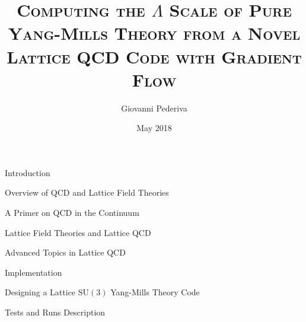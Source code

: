 \documentclass[twoside,english, a4paper, 11pt]{shared/uiofysmaster}
\author{Giovanni Pederiva}
\title{{\scshape Computing the $\Lambda$ Scale of Pure Yang-Mills Theory from a Novel Lattice QCD Code with Gradient Flow}}
\date{May 2018}
\begin{document}


\maketitle
\clearpage



\begin{abstract}
	
	\cleardoublepage
	\begin{acknowledgements}
		
	\end{acknowledgements}
	\clearpage
\end{abstract}
\tableofcontents
\clearpage 

\begin{chapter}{Introduction}
	\label{chap:intro}
	  
\end{chapter}

\begin{part}{Overview of QCD and Lattice Field Theories}
	\label{part:intro}
	\begin{chapter}{A Primer on QCD in the Continuum}
		\label{chap:qcd_intro}
  		
	\end{chapter}

	\begin{chapter}{Lattice Field Theories and Lattice QCD}
		\label{chap:lattice_intro}
	  	
	\end{chapter}

	\begin{chapter}{Advanced Topics in Lattice QCD}
		\label{chap:grad_intro}
	  	
	\end{chapter}

\end{part}


\begin{part}{Implementation}
	\label{part:implementation}
	\begin{chapter}{Designing a Lattice $\mathrm{SU(3)}$ Yang-Mills Theory Code}
  		\label{chap:code_design}
  		
	\end{chapter}

	\begin{chapter}{Tests and Runs Description}
		\label{chap:test_runs}
		
  \end{chapter}
\end{part}
\end{document}
